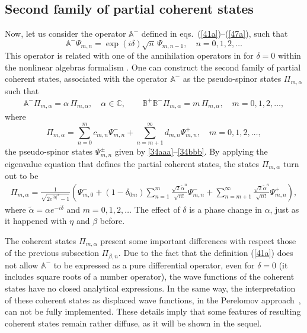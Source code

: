 \documentclass[aps,showpacs,showkeys]{revtex4}
\begin{document}
\subsection{Second family of partial coherent states}\label{sec3.2}
Now, let us consider the operator $\mathbb{A}^-$ defined in eqs.~(\ref{41a})--(\ref{47a}), such that
\begin{equation}\label{70}
\mathbb{A}^-\Psi_{m,n}=\exp(i\delta)\sqrt{n}\,\Psi_{m,n-1}, \quad n=0,1,2,\dots
\end{equation}
This operator is related with one of the annihilation operators in \cite{df17} for $\delta=0$ within the nonlinear algebras formalism \cite{mmsz93,mmsz93a,hh02,rr00,rr00a,s00}.
One can construct the second family of partial coherent states, associated with the operator $\mathbb{A}^-$ as the pseudo-spinor states $\Pi_{m,\alpha}$ such that
	\begin{eqnarray}
\mathbb{A}^- \Pi_{m,\alpha}=\alpha\, \Pi_{m,\alpha}, \quad \alpha\in\mathbb{C}, 
\qquad
\mathbb{B}^+\mathbb{B}^- \Pi_{m,\alpha}=m\, \Pi_{m,\alpha}, \quad m=0,1,2,\dots, 
\end{eqnarray}
where
\begin{equation}\label{77}
\Pi_{m,\alpha}=\sum_{n=0}^{m}c_{m,n}\Psi_{m,n}^{-}+\sum_{n=m+1}^{\infty}d_{m,n}\Psi_{m,n}^{+}, \quad m=0,1,2,\dots,
\end{equation}
the pseudo-spinor states $\Psi_{m,n}^{\pm}$ given by \eqref{34aaa}--\eqref{34bbb}.
By applying the eigenvalue equation that defines the partial coherent states, the states $\Pi_{m,\alpha}$ turn out to be
\begin{eqnarray}\label{78}
\Pi_{m,\alpha}=\frac{1}{\sqrt{2 e^{\vert\tilde{\alpha}\vert^2} -1}}\left( \Psi_{m,0}^- +(1-\delta_{0m})\sum_{n=1}^{m}\frac{\sqrt{2}\tilde{\alpha}^n}{\sqrt{n!}}\Psi_{m,n}^{-} 
+\sum_{n=m+1}^{\infty}\frac{\sqrt{2}\tilde{\alpha}^n}{\sqrt{n!}}\Psi_{m,n}^{+}\right),  
\end{eqnarray}
where $\tilde{\alpha}=\alpha e^{-i\delta}$ and $m=0,1,2,\dots$ The effect of $\delta$ is a phase change in $\alpha$, just as it happened with $\eta$ and $\beta$ before.

The coherent states $\Pi_{m,\alpha}$ present some important differences with respect those of the previous subsection $\Pi_{\beta,n}$. Due to the fact that the definition (\ref{41a}) does not allow $\mathbb{A}^{-}$ to be expressed as a pure differential operator, even for $\delta=0$ (it includes square roots of a number operator), the wave functions of the coherent states have no closed analytical expressions. In the same way, the interpretation of these coherent states as displaced wave functions, in the Perelomov approach~\cite{p72}, can not be fully implemented. These details imply that some features of resulting coherent states remain rather diffuse, as it will be shown in the sequel.
\end{document}

